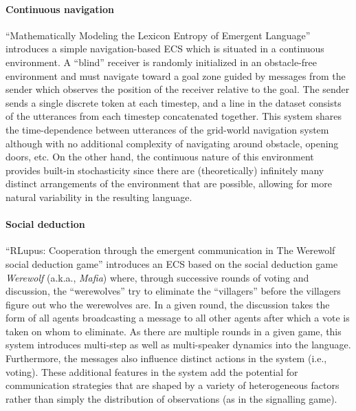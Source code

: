 \paragraph{Continuous navigation}
``Mathematically Modeling the Lexicon Entropy of Emergent Language'' \citep[GPL-3.0 license]{boldt2022MathematicallyMT} introduces a simple navigation-based ECS which is situated in a continuous environment.
A ``blind'' receiver is randomly initialized in an obstacle-free environment and must navigate toward a goal zone guided by messages from the sender which observes the position of the receiver relative to the goal.
The sender sends a single discrete token at each timestep, and a line in the dataset consists of the utterances from each timestep concatenated together.
This system shares the time-dependence between utterances of the grid-world navigation system although with no additional complexity of navigating around obstacle, opening doors, etc.
On the other hand, the continuous nature of this environment provides built-in stochasticity since there are (theoretically) infinitely many distinct arrangements of the environment that are possible, allowing for more natural variability in the resulting language.

\paragraph{Social deduction}
``RLupus: Cooperation through the emergent communication in The Werewolf social deduction game'' \citep[GPL-3.0 license]{brandizzi2022rlupus} introduces an ECS based on the social deduction game \emph{Werewolf} (a.k.a., \emph{Mafia}) where, through successive rounds of voting and discussion, the ``werewolves'' try to eliminate the ``villagers'' before the villagers figure out who the werewolves are.
In a given round, the discussion takes the form of all agents broadcasting a message to all other agents after which a vote is taken on whom to eliminate.
As there are multiple rounds in a given game, this system introduces multi-step as well as multi-speaker dynamics into the language.
Furthermore, the messages also influence distinct actions in the system (i.e., voting).
These additional features in the system add the potential for communication strategies that are shaped by a variety of heterogeneous factors rather than simply the distribution of observations (as in the signalling game).
